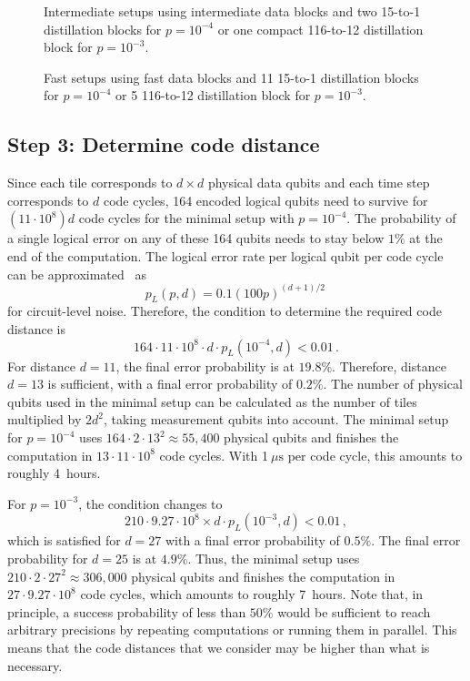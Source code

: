 \documentclass[prx,aps,letterpaper,twocolumn,allowfontchageintitle=true,accepted=2019-02-01]{quantumarticle}
\begin{document}
\begin{figure}[t!]
\centering
\def\svgwidth{\linewidth}

\caption{Intermediate setups using intermediate data blocks and two 15-to-1 distillation blocks for $p=10^{-4}$ or one compact 116-to-12 distillation block for $p=10^{-3}$.}
\label{fig:intermediatesetup}
\end{figure}

\begin{figure}[t!]
\centering
\def\svgwidth{0.975\linewidth}

\caption{Fast setups using fast data blocks and 11 15-to-1 distillation blocks for $p=10^{-4}$ or 5 116-to-12 distillation block for $p=10^{-3}$.}
\label{fig:fastsetup}
\end{figure}


\subsection{Step 3: Determine code distance}

Since each tile corresponds to $d \times d$ physical data qubits and each time step corresponds to $d$ code cycles, 164 encoded logical qubits need to survive for $(11 \cdot 10^8)d$ code cycles for the minimal setup with $p=10^{-4}$. The probability of a single logical error on any of these 164 qubits needs to stay below $1\%$ at the end of the computation. The logical error rate per logical qubit per code cycle can be approximated~\cite{Fowler2018} as
\begin{equation}
	p_L(p,d) = 0.1(100p)^{(d+1)/2} \, 
\end{equation}
for circuit-level noise. Therefore, the condition to determine the required code distance is
\begin{equation}
	164 \cdot 11 \cdot 10^8 \cdot d \cdot p_L(10^{-4},d) < 0.01 \, .
\end{equation}
For distance $d=11$, the final error probability is at $19.8\%$. Therefore, distance $d=13$ is sufficient, with a final error probability of $0.2\%$. The number of physical qubits used in the minimal setup can be calculated as the number of tiles multiplied by $2d^2$, taking measurement qubits into account. The minimal setup for $p=10^{-4}$ uses $164\cdot 2 \cdot 13^2 \approx 55{,}400$ physical qubits and finishes the computation in $13 \cdot 11 \cdot 10^8$ code cycles. With 1$~\mu\mathrm{s}$ per code cycle, this amounts to roughly 4~hours. 

For $p=10^{-3}$, the condition changes to
\begin{equation}
	210 \cdot 9.27 \cdot 10^8 \times d \cdot p_L(10^{-3},d) < 0.01 \, ,
\end{equation}
which is satisfied for $d=27$ with a final error probability of  $0.5\%$. The final error probability for $d=25$ is at $4.9\%$. Thus, the minimal setup uses $210\cdot 2 \cdot 27^2 \approx 306{,}000$ physical qubits and finishes the computation in $27 \cdot 9.27 \cdot 10^8$ code cycles, which amounts to roughly 7~hours.
Note that, in principle, a success probability of less than $50\%$ would be sufficient to reach arbitrary precisions by repeating computations or running them in parallel. This means that the code distances that we consider may be higher than what is necessary. 
\end{document}

